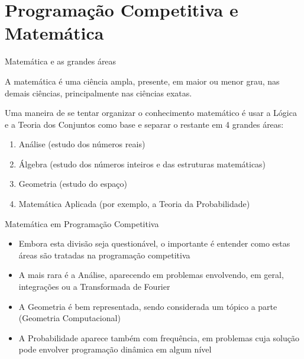 \section*{Programação Competitiva e Matemática}

\begin{frame}[fragile]{Matemática e as grandes áreas}

A matemática é uma ciência ampla, presente, em maior ou menor grau, nas demais ciências, principalmente nas ciências exatas. 

Uma maneira de se tentar organizar o conhecimento matemático é usar a Lógica e a Teoria dos Conjuntos como base e separar o restante em 4 grandes áreas:

\begin{enumerate}
    \item Análise (estudo dos números reais)
    \item Álgebra (estudo dos números inteiros e das estruturas matemáticas)
    \item Geometria (estudo do espaço)
    \item Matemática Aplicada (por exemplo, a Teoria da Probabilidade)
\end{enumerate}

\end{frame}

\begin{frame}[fragile]{Matemática em Programação Competitiva}

    \begin{itemize}
        \item Embora esta divisão seja questionável, o importante é entender como estas áreas são tratadas na programação competitiva

        \item A mais rara é a Análise, aparecendo em problemas envolvendo, em geral, integrações ou a Transformada de Fourier

        \item A Geometria é bem representada, sendo considerada um tópico a parte (Geometria Computacional)

        \item A Probabilidade aparece também com frequência, em problemas cuja solução pode envolver programação dinâmica em algum nível
    \end{itemize}

\end{frame}

